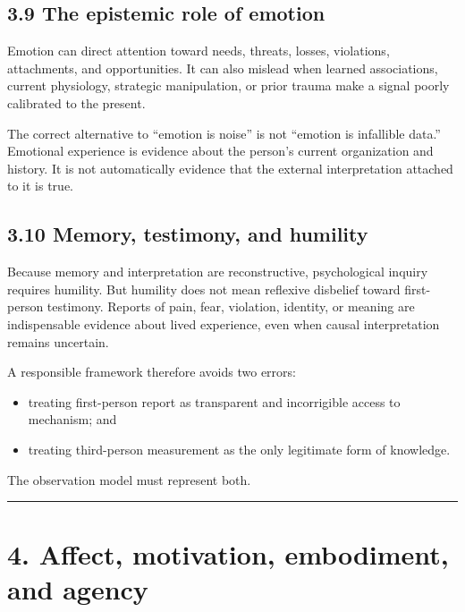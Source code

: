 \documentclass[
  11pt,
]{article}
\providecommand{\tightlist}{%
  \setlength{\itemsep}{0pt}\setlength{\parskip}{0pt}}
\begin{document}
\subsection{3.9 The epistemic role of
emotion}\label{the-epistemic-role-of-emotion}

Emotion can direct attention toward needs, threats, losses, violations,
attachments, and opportunities. It can also mislead when learned
associations, current physiology, strategic manipulation, or prior
trauma make a signal poorly calibrated to the present.

The correct alternative to ``emotion is noise'' is not ``emotion is
infallible data.'' Emotional experience is evidence about the person's
current organization and history. It is not automatically evidence that
the external interpretation attached to it is true.

\subsection{3.10 Memory, testimony, and
humility}\label{memory-testimony-and-humility}

Because memory and interpretation are reconstructive, psychological
inquiry requires humility. But humility does not mean reflexive
disbelief toward first-person testimony. Reports of pain, fear,
violation, identity, or meaning are indispensable evidence about lived
experience, even when causal interpretation remains uncertain.

A responsible framework therefore avoids two errors:

\begin{itemize}
\tightlist
\item
  treating first-person report as transparent and incorrigible access to
  mechanism; and
\item
  treating third-person measurement as the only legitimate form of
  knowledge.
\end{itemize}

The observation model must represent both.

\begin{center}\rule{0.5\linewidth}{0.5pt}\end{center}

\section{4. Affect, motivation, embodiment, and
agency}\label{affect-motivation-embodiment-and-agency}
\end{document}
